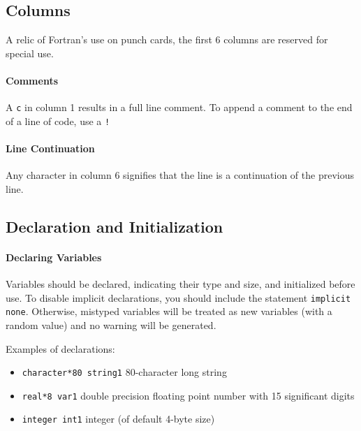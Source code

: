 \documentclass[10pt,letterpaper,oneside]{report}
\begin{document}
\begin{itemize}
\subsection{Columns}
A relic of Fortran's use on punch cards, the first 6 columns are reserved for special use.  

\paragraph{Comments}
A \texttt{c} in column 1 results in a full line comment.  To append a comment to the end of a line of code, use a \texttt{!}

\paragraph{Line Continuation}
Any character in column 6 signifies that the line is a continuation of the previous line. 

\subsection{Declaration and Initialization}
\paragraph{Declaring Variables}
Variables should be declared, indicating their type and size, and initialized before use.  To disable implicit declarations, you should include the statement \texttt{implicit none}.  Otherwise, mistyped variables will be treated as new variables (with a random value) and no warning will be generated.  

Examples of declarations: 
\begin{itemize}
\item \texttt{character*80 string1} 80-character long string
\item \texttt{real*8 var1} double precision floating point number with 15 significant digits
\item \texttt{integer int1} integer (of default 4-byte size)
\end{itemize}


\end{itemize}
\end{document}
